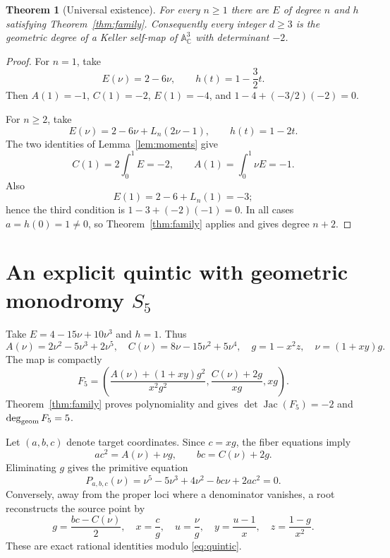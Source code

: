 \documentclass[11pt]{amsart}
\newtheorem{theorem}{Theorem}[section]
\theoremstyle{remark}
\newcommand{\A}{\mathbb A}
\newcommand{\C}{\mathbb C}
\newcommand{\Jac}{\operatorname{Jac}}
\begin{document}
\begin{theorem}[Universal existence]\label{thm:existence}
For every $n\ge1$ there are $E$ of degree $n$ and $h$ satisfying Theorem~\ref{thm:family}.  Consequently every integer $d\ge3$ is the geometric degree of a Keller self-map of $\A^3_\C$ with determinant $-2$.
\end{theorem}
\begin{proof}
For $n=1$, take
\[
 E(\nu)=2-6\nu,
 \qquad h(t)=1-\frac32t.
\]
Then $A(1)=-1$, $C(1)=-2$, $E(1)=-4$, and
$1-4+(-3/2)(-2)=0$.

For $n\ge2$, take
\begin{equation}\label{eq:legendre-family}
 E(\nu)=2-6\nu+L_n(2\nu-1),
 \qquad h(t)=1-2t.
\end{equation}
The two identities of Lemma~\ref{lem:moments} give
\[
 C(1)=2\int_0^1E=-2,
 \qquad A(1)=\int_0^1\nu E=-1.
\]
Also
\[
 E(1)=2-6+L_n(1)=-3;
\]
hence the third condition is
$1-3+(-2)(-1)=0$.  In all cases $a=h(0)=1\ne0$, so Theorem~\ref{thm:family} applies and gives degree $n+2$.
\end{proof}

\section{An explicit quintic with geometric monodromy \texorpdfstring{$S_5$}{S5}}
Take $E=4-15\nu+10\nu^3$ and $h=1$.  Thus
\[
 A(\nu)=2\nu^2-5\nu^3+2\nu^5,
 \quad C(\nu)=8\nu-15\nu^2+5\nu^4,
 \quad g=1-x^2z,
 \quad \nu=(1+xy)g.
\]
The map is compactly
\begin{equation}\label{eq:F5}
 F_5=\left(
 \frac{A(\nu)+(1+xy)g^2}{x^2g^2},
 \frac{C(\nu)+2g}{xg},
 xg\right).
\end{equation}
Theorem~\ref{thm:family} proves polynomiality and gives
$\det\Jac(F_5)=-2$ and $\deg_{\rm geom}F_5=5$.

Let $(a,b,c)$ denote target coordinates.  Since $c=xg$, the fiber equations imply
\[
 ac^2=A(\nu)+\nu g,
 \qquad bc=C(\nu)+2g.
\]
Eliminating $g$ gives the primitive equation
\begin{equation}\label{eq:quintic}
 P_{a,b,c}(\nu)=\nu^5-5\nu^3+4\nu^2-bc\nu+2ac^2=0.
\end{equation}
Conversely, away from the proper loci where a denominator vanishes, a root reconstructs the source point by
\begin{equation}\label{eq:reconstruction}
 g=\frac{bc-C(\nu)}2,
 \quad x=\frac c g,
 \quad u=\frac\nu g,
 \quad y=\frac{u-1}{x},
 \quad z=\frac{1-g}{x^2}.
\end{equation}
These are exact rational identities modulo \eqref{eq:quintic}.
\end{document}
